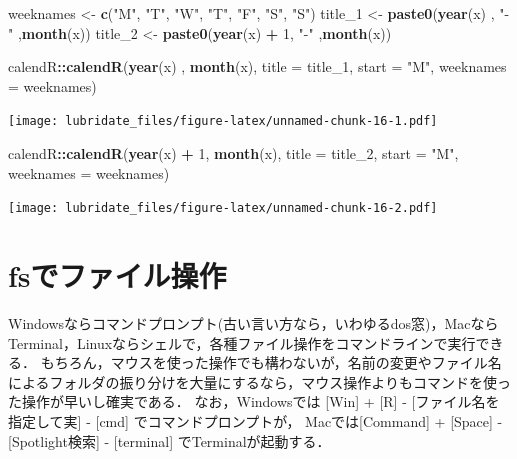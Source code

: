 \documentclass[
]{article}
\newenvironment{Shaded}{\begin{snugshade}}{\end{snugshade}}
\newcommand{\AttributeTok}[1]{\textcolor[rgb]{0.13,0.29,0.53}{#1}}
\newcommand{\DecValTok}[1]{\textcolor[rgb]{0.00,0.00,0.81}{#1}}
\newcommand{\FunctionTok}[1]{\textcolor[rgb]{0.13,0.29,0.53}{\textbf{#1}}}
\newcommand{\NormalTok}[1]{#1}
\newcommand{\OtherTok}[1]{\textcolor[rgb]{0.56,0.35,0.01}{#1}}
\newcommand{\SpecialCharTok}[1]{\textcolor[rgb]{0.81,0.36,0.00}{\textbf{#1}}}
\newcommand{\StringTok}[1]{\textcolor[rgb]{0.31,0.60,0.02}{#1}}
\begin{document}
\begin{Shaded}
\begin{Highlighting}[]
\NormalTok{weeknames }\OtherTok{\textless{}{-}}  \FunctionTok{c}\NormalTok{(}\StringTok{"M"}\NormalTok{, }\StringTok{"T"}\NormalTok{, }\StringTok{"W"}\NormalTok{, }\StringTok{"T"}\NormalTok{, }\StringTok{"F"}\NormalTok{, }\StringTok{"S"}\NormalTok{, }\StringTok{"S"}\NormalTok{)}
\NormalTok{title\_1 }\OtherTok{\textless{}{-}} \FunctionTok{paste0}\NormalTok{(}\FunctionTok{year}\NormalTok{(x)    , }\StringTok{"{-}"}\NormalTok{ ,}\FunctionTok{month}\NormalTok{(x))}
\NormalTok{title\_2 }\OtherTok{\textless{}{-}} \FunctionTok{paste0}\NormalTok{(}\FunctionTok{year}\NormalTok{(x) }\SpecialCharTok{+} \DecValTok{1}\NormalTok{, }\StringTok{"{-}"}\NormalTok{ ,}\FunctionTok{month}\NormalTok{(x))}

\NormalTok{calendR}\SpecialCharTok{::}\FunctionTok{calendR}\NormalTok{(}\FunctionTok{year}\NormalTok{(x)    , }\FunctionTok{month}\NormalTok{(x), }\AttributeTok{title =}\NormalTok{ title\_1, }\AttributeTok{start =} \StringTok{"M"}\NormalTok{, }\AttributeTok{weeknames =}\NormalTok{ weeknames)}
\end{Highlighting}
\end{Shaded}

\texttt{[image: lubridate\_files/figure-latex/unnamed-chunk-16-1.pdf]}

\begin{Shaded}
\begin{Highlighting}[]
\NormalTok{calendR}\SpecialCharTok{::}\FunctionTok{calendR}\NormalTok{(}\FunctionTok{year}\NormalTok{(x) }\SpecialCharTok{+} \DecValTok{1}\NormalTok{, }\FunctionTok{month}\NormalTok{(x), }\AttributeTok{title =}\NormalTok{ title\_2, }\AttributeTok{start =} \StringTok{"M"}\NormalTok{, }\AttributeTok{weeknames =}\NormalTok{ weeknames)}
\end{Highlighting}
\end{Shaded}

\texttt{[image: lubridate\_files/figure-latex/unnamed-chunk-16-2.pdf]}

\hypertarget{fs}{%
\section{fsでファイル操作}\label{fs}}

Windowsならコマンドプロンプト(古い言い方なら，いわゆるdos窓)，MacならTerminal，Linuxならシェルで，各種ファイル操作をコマンドラインで実行できる．
もちろん，マウスを使った操作でも構わないが，名前の変更やファイル名によるフォルダの振り分けを大量にするなら，マウス操作よりもコマンドを使った操作が早いし確実である．
なお，Windowsでは {[}Win{]} + {[}R{]} - {[}ファイル名を指定して実{]} - {[}cmd{]} でコマンドプロンプトが，
Macでは{[}Command{]} + {[}Space{]} - {[}Spotlight検索{]} - {[}terminal{]} でTerminalが起動する．
\end{document}
